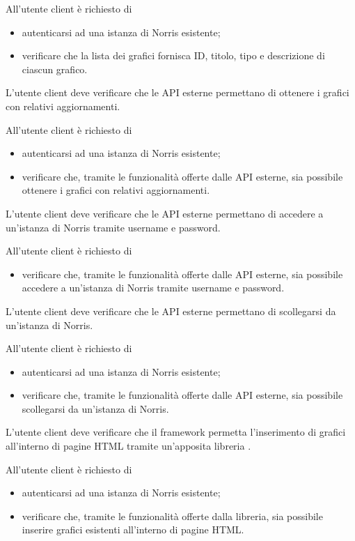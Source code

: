 		All'utente client è richiesto di
		\begin{itemize}
			\item autenticarsi ad una istanza di Norris esistente;
			\item verificare che la lista dei grafici fornisca ID, titolo, tipo e descrizione di ciascun grafico.
		\end{itemize}

	L'utente client deve verificare che le API esterne permettano di ottenere i grafici con relativi aggiornamenti.
		
		All'utente client è richiesto di
		\begin{itemize}
			\item autenticarsi ad una istanza di Norris esistente;
			\item verificare che, tramite le funzionalità offerte dalle API esterne, sia possibile ottenere i grafici con relativi aggiornamenti.
		\end{itemize}

	L'utente client deve verificare che le API esterne permettano di accedere a un'istanza di Norris tramite username e password.
		
		All'utente client è richiesto di
		\begin{itemize}
			\item verificare che, tramite le funzionalità offerte dalle API esterne, sia possibile accedere a un'istanza di Norris tramite username e password.
		\end{itemize}

	 L'utente client deve verificare che le API esterne permettano di scollegarsi  da un'istanza di Norris.
		
		All'utente client è richiesto di
		\begin{itemize}
			\item autenticarsi ad una istanza di Norris esistente;
			\item verificare che, tramite le funzionalità offerte dalle API esterne, sia possibile scollegarsi da un'istanza di Norris.
		\end{itemize}

	L'utente client deve verificare che il framework permetta l'inserimento di grafici all'interno di pagine HTML tramite un'apposita libreria .
		
		All'utente client è richiesto di
		\begin{itemize}
			\item autenticarsi ad una istanza di Norris esistente;
			\item verificare che, tramite le funzionalità offerte dalla libreria, sia possibile inserire grafici esistenti all'interno di pagine HTML.
		\end{itemize}

